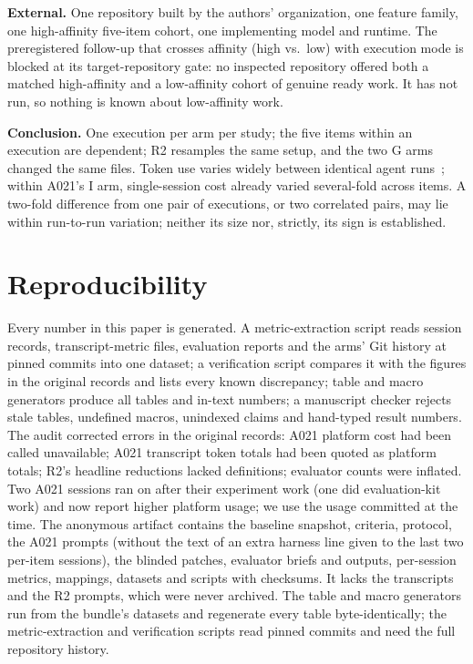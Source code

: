 \documentclass[10pt,conference]{IEEEtran}
\newcommand{\G}{G}
\newcommand{\I}{I}
\begin{document}
\textbf{External.} One repository built by the authors' organization, one feature family, one high-affinity five-item cohort, one implementing model and runtime. The preregistered follow-up that crosses affinity (high vs.\ low) with execution mode is blocked at its target-repository gate: no inspected repository offered both a matched high-affinity and a low-affinity cohort of genuine ready work. It has not run, so nothing is known about low-affinity work. %

\textbf{Conclusion.} One execution per arm per study; the five items within an execution are dependent; R2 resamples the same setup, and the two \G{} arms changed the same files. Token use varies widely between identical agent runs~\cite{bai2026tokens}; within A021's \I{} arm, single-session cost already varied several-fold across items. A two-fold difference from one pair of executions, or two correlated pairs, may lie within run-to-run variation; neither its size nor, strictly, its sign is established. %

\section{Reproducibility}\label{sec:repro}

Every number in this paper is generated. A metric-extraction script reads session records, transcript-metric files, evaluation reports and the arms' Git history at pinned commits into one dataset; a verification script compares it with the figures in the original records and lists every known discrepancy; table and macro generators produce all tables and in-text numbers; a manuscript checker rejects stale tables, undefined macros, unindexed claims and hand-typed result numbers. %
The audit corrected errors in the original records: A021 platform cost had been called unavailable; A021 transcript token totals had been quoted as platform totals; R2's headline reductions lacked definitions; evaluator counts were inflated. Two A021 sessions ran on after their experiment work (one did evaluation-kit work) and now report higher platform usage; we use the usage committed at the time. %
The anonymous artifact contains the baseline snapshot, criteria, protocol, the A021 prompts (without the text of an extra harness line given to the last two per-item sessions), the blinded patches, evaluator briefs and outputs, per-session metrics, mappings, datasets and scripts with checksums. It lacks the transcripts and the R2 prompts, which were never archived. The table and macro generators run from the bundle's datasets and regenerate every table byte-identically; the metric-extraction and verification scripts read pinned commits and need the full repository history. %
\end{document}
